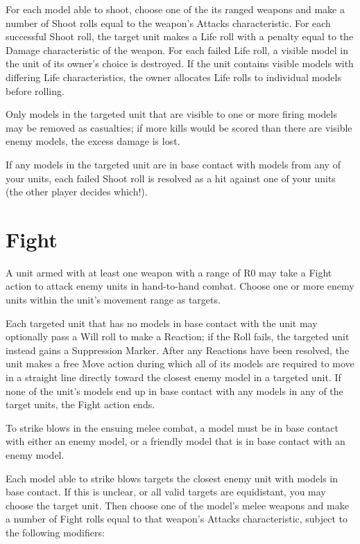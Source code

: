 \begin{multicols}{2}
For each model able to shoot, choose one of the its ranged weapons and make a number of Shoot rolls equal to the weapon's Attacks characteristic. For each successful Shoot roll, the target unit makes a Life roll with a penalty equal to the Damage characteristic of the weapon. For each failed Life roll, a visible model in the unit of its owner's choice is destroyed. If the unit contains visible models with differing Life characteristics, the owner allocates Life rolls to individual models before rolling.

Only models in the targeted unit that are visible to one or more firing models may be removed as casualties; if more kills would be scored than there are visible enemy models, the excess damage is lost.

If any models in the targeted unit are in base contact with models from any of your units, each failed Shoot roll is resolved as a hit against one of your units (the other player decides which!).




\section*{Fight}
A unit armed with at least one weapon with a range of R0 may take a Fight action to attack enemy units in hand-to-hand combat. Choose one or more enemy units within the unit's movement range as targets.

Each targeted unit that has no models in base contact with the unit may optionally pass a Will roll to make a Reaction; if the Roll fails, the targeted unit instead gains a Suppression Marker. After any Reactions have been resolved, the unit makes a free Move action during which all of its models are required to move in a straight line directly toward the closest enemy model in a targeted unit. If none of the unit's models end up in base contact with any models in any of the target units, the Fight action ends.

To strike blows in the ensuing melee combat, a model must be in base contact with either an enemy model, or a friendly model that is in base contact with an enemy model.

Each model able to strike blows targets the closest enemy unit with models in base contact. If this is unclear, or all valid targets are equidistant, you may choose the target unit. Then choose one of the model's melee weapons and make a number of Fight rolls equal to that weapon's Attacks characteristic, subject to the following modifiers:


\end{multicols}

